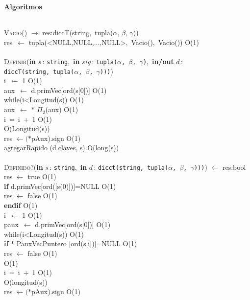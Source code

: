 \documentclass[10pt, a4paper]{article}
\let\NombreFuncion=\textsc
\let\TipoVariable=\texttt
\let\ModificadorArgumento=\textbf
\newcommand{\tab}{\hspace*{7mm}}
\newcommand{\In}[2]{\ModificadorArgumento{in} \ensuremath{#1}\,: \TipoVariable{#2}\xspace}
\newcommand{\Inout}[2]{\ModificadorArgumento{in/out} \ensuremath{#1}\,: \TipoVariable{#2}\xspace}
\newenvironment{Algoritmos}{%
  \vspace*{2ex}%
  \noindent\textbf{\Large Algoritmos}%
  \vspace*{2ex}%
}{}
\begin{document}
	\begin{Algoritmos}
\\
	\NombreFuncion{Vacio}() $\rightarrow$ res:diccT(string,\ tupla($\alpha$, $\beta$, $\gamma$))
\\
\tab	res\ $\leftarrow$ tupla(<NULL,NULL,...,NULL>,\ Vacio(),\ Vacio())	\hfill O(1)
\\ \\
	\NombreFuncion{Definir}(\In{s}{string},\ \In{sig}{tupla($\alpha$, $\beta$, $\gamma$)},\ \Inout{d}{diccT(string,\ tupla($\alpha$, $\beta$, $\gamma$)))})
\\
\tab	i\ $\leftarrow$ 1 \hfill O(1)
\\
\tab	aux\ $\leftarrow$ d.primVec[ord(s[0])]  \hfill O(1)
\\
\tab	while(i<Longitud(s))  \hfill O(1)
\\
\tab \tab	aux\ $\leftarrow$ $\ast$ $\Pi_2$(aux)  \hfill O(1)
\\
\tab \tab	i\ =\ i\ +\ 1  \hfill O(1)
\\
\tab {} \hfill O(Longitud(s))
\\
\tab res $\leftarrow (\ast$pAux).sign \hfill O(1)
\\
\tab agregarRapido (d.claves, s) \hfill O(long(s))
\\ \\
	\NombreFuncion{Definido?}(\In{s}{string},\ \In{d}{dicct(string,\ tupla($\alpha$, $\beta$, $\gamma$)))}) $\leftarrow$ res:bool
\\
\tab res $\leftarrow$ true \hfill O(1)
\\
\tab \textbf{if} d.primVec[ord([s(0)])]=NULL \hfill O(1)
\\
\tab \tab res $\leftarrow$ false \hfill O(1)
\\
\tab \textbf{endif} \hfill O(1)
\\
\tab i\ $\leftarrow$ 1 \hfill O(1)
\\
\tab paux\ $\leftarrow$ d.primVec[ord(s[0])] \hfill O(1)
\\
\tab while(i<Longitud(s)) \hfill O(1)
\\
\tab \tab \textbf{if} $\ast$ PauxVecPuntero [ord(s[i])]=NULL \hfill O(1)
\\
\tab \tab \tab res $\leftarrow$ false \hfill O(1)
\\
\tab \tab {} \hfill O(1)
\\
\tab \tab	i\ =\ i\ +\ 1 \hfill O(1)
\\
\tab {} \hfill O(longitud(s))
\\
\tab res $\leftarrow (\ast$pAux).sign \hfill O(1)

\end{Algoritmos}
\end{document}
